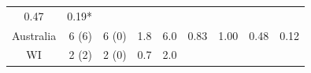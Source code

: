 \begin{longtable}[]{@{}crrrrllrl@{}}
\begin{minipage}[t]{0.06\columnwidth}
0.47\strut
\end{minipage} & \begin{minipage}[t]{0.07\columnwidth}\raggedright\strut
0.19*\strut
\end{minipage}\tabularnewline
\begin{minipage}[t]{0.12\columnwidth}\centering\strut
Australia\strut
\end{minipage} & \begin{minipage}[t]{0.08\columnwidth}\raggedleft\strut
6 (6)\strut
\end{minipage} & \begin{minipage}[t]{0.13\columnwidth}\raggedleft\strut
6 (0)\strut
\end{minipage} & \begin{minipage}[t]{0.04\columnwidth}\raggedleft\strut
1.8\strut
\end{minipage} & \begin{minipage}[t]{0.05\columnwidth}\raggedleft\strut
6.0\strut
\end{minipage} & \begin{minipage}[t]{0.11\columnwidth}\raggedright\strut
0.83\strut
\end{minipage} & \begin{minipage}[t]{0.06\columnwidth}\raggedright\strut
1.00\strut
\end{minipage} & \begin{minipage}[t]{0.06\columnwidth}\raggedleft\strut
0.48\strut
\end{minipage} & \begin{minipage}[t]{0.07\columnwidth}\raggedright\strut
0.12\strut
\end{minipage}\tabularnewline
\begin{minipage}[t]{0.12\columnwidth}\centering\strut
WI\strut
\end{minipage} & \begin{minipage}[t]{0.08\columnwidth}\raggedleft\strut
2 (2)\strut
\end{minipage} & \begin{minipage}[t]{0.13\columnwidth}\raggedleft\strut
2 (0)\strut
\end{minipage} & \begin{minipage}[t]{0.04\columnwidth}\raggedleft\strut
0.7\strut
\end{minipage} & \begin{minipage}[t]{0.05\columnwidth}\raggedleft\strut
2.0\strut
\end{minipage} & \begin{minipage}[t]{0.11\columnwidth}\raggedright\strut

\end{minipage}
\end{longtable}
